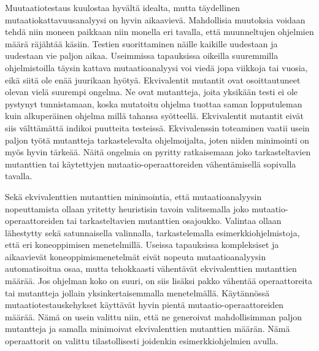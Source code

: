 \documentclass[finnish]{tktltiki2}
\begin{document}
Muutaatiotestaus kuulostaa hyvältä idealta, mutta täydellinen mutaatiokattavuusanalyysi on hyvin aikaavievä. Mahdollisia muutoksia voidaan tehdä niin moneen paikkaan niin monella eri tavalla, että muunneltujen ohjelmien määrä räjähtää käsiin. Testien suorittaminen näille kaikille uudestaan ja uudestaan vie paljon aikaa. Useimmissa tapauksissa oikeilla suuremmilla ohjelmistoilla täysin kattava mutaatioanalyysi voi viedä jopa viikkoja tai vuosia, eikä siitä ole enää juurikaan hyötyä. Ekvivalentit mutantit ovat osoittautuneet olevan vielä suurempi ongelma. Ne ovat mutantteja, joita yksikään testi ei ole pystynyt tunnistamaan, koska mutatoitu ohjelma tuottaa saman lopputuleman kuin alkuperäinen ohjelma millä tahansa syötteellä. Ekvivalentit mutantit eivät siis välttämättä indikoi puutteita testeissä. Ekvivalenssin toteaminen vaatii usein paljon työtä mutantteja tarkastelevalta ohjelmoijalta, joten niiden minimointi on myös hyvin tärkeää. Näitä ongelmia on pyritty ratkaisemaan joko tarkasteltavien mutanttien tai käytettyjen mutaatio-operaattoreiden vähentämisellä sopivalla tavalla. 

Sekä ekvivalenttien mutanttien minimointia, että mutaatioanalyysin nopeuttamista ollaan yritetty heuristisin tavoin valitsemalla joko mutaatio-operaattoreiden tai tarkasteltavien mutanttien osajoukko. Valintaa ollaan lähestytty sekä satunnaisella valinnalla, tarkastelemalla esimerkkiohjelmistoja, että eri koneoppimisen menetelmillä. Useissa tapauksissa kompleksiset ja aikaavievät koneoppimismenetelmät eivät nopeuta mutaatioanalyysin automatisoitua osaa, mutta tehokkaasti vähentävät ekvivalenttien mutanttien määrää. Jos ohjelman koko on suuri, on siis lisäksi pakko vähentää operaattoreita tai mutantteja jollain yksinkertaisemmalla menetelmällä. Käytännössä mutaatiotestauskehykset käyttävät hyvin pientä mutaatio-operaattoreiden määrää. Nämä on usein valittu niin, että ne generoivat mahdollisimman paljon mutantteja ja samalla minimoivat ekvivalenttien mutanttien määrän. Nämä operaattorit on valittu tilastollisesti joidenkin esimerkkiohjelmien avulla.

{}

\end{document}
